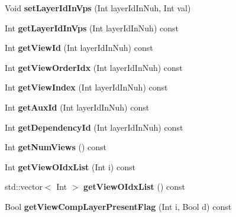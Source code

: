 \begin{DoxyCompactItemize}
Void {\bfseries set\+Layer\+Id\+In\+Vps} (Int layer\+Id\+In\+Nuh, Int val)
\item 
\mbox{\label{class_t_com_v_p_s_a295f65b69335045e113b3fea883589e8}} 
Int {\bfseries get\+Layer\+Id\+In\+Vps} (Int layer\+Id\+In\+Nuh) const
\item 
\mbox{\label{class_t_com_v_p_s_a248b73452230950cf8d59722b968d817}} 
Int {\bfseries get\+View\+Id} (Int layer\+Id\+In\+Nuh) const
\item 
\mbox{\label{class_t_com_v_p_s_ab8a3fb769dd06926bba58450055e5050}} 
Int {\bfseries get\+View\+Order\+Idx} (Int layer\+Id\+In\+Nuh) const
\item 
\mbox{\label{class_t_com_v_p_s_abf14918293c0fbdb37fab3b6bf19c6e2}} 
Int {\bfseries get\+View\+Index} (Int layer\+Id\+In\+Nuh) const
\item 
\mbox{\label{class_t_com_v_p_s_adad44c34d60b60963211647faccd9192}} 
Int {\bfseries get\+Aux\+Id} (Int layer\+Id\+In\+Nuh) const
\item 
\mbox{\label{class_t_com_v_p_s_a2455290416378d06e7062ad3c42539fe}} 
Int {\bfseries get\+Dependency\+Id} (Int layer\+Id\+In\+Nuh) const
\item 
\mbox{\label{class_t_com_v_p_s_a01da73dfcecd999026e37b75ba09b6b2}} 
Int {\bfseries get\+Num\+Views} () const
\item 
\mbox{\label{class_t_com_v_p_s_a81b1f7988e03a37851ecee035cce591c}} 
Int {\bfseries get\+View\+O\+Idx\+List} (Int i) const
\item 
\mbox{\label{class_t_com_v_p_s_ac056510f30bdddd644f6455eb9462d9e}} 
std\+::vector$<$ Int $>$ {\bfseries get\+View\+O\+Idx\+List} () const
\item 
\mbox{\label{class_t_com_v_p_s_a2a03db8c5aed243a87c89ad0e0062820}} 
Bool {\bfseries get\+View\+Comp\+Layer\+Present\+Flag} (Int i, Bool d) const
\item 
\mbox{\label{class_t_com_v_p_s_a077786c679255cf6fd9c14fb4730777b}} 

\end{DoxyCompactItemize}
